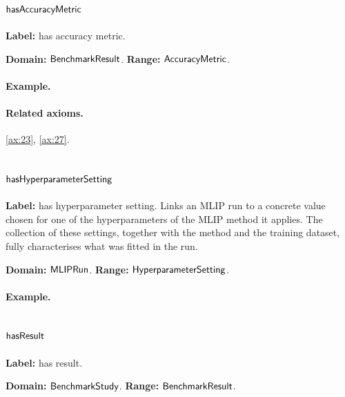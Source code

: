 \subsection{$\mathsf{hasAccuracyMetric}$}
\label{sec:term-hasAccuracyMetric}

\textbf{Label:} has accuracy metric.

\textbf{Domain:} $\mathsf{BenchmarkResult}$.
\textbf{Range:} $\mathsf{AccuracyMetric}$.

\paragraph{Example.}

\paragraph{Related axioms.} \eqref{ax:23}, \eqref{ax:27}.

\subsection{$\mathsf{hasHyperparameterSetting}$}
\label{sec:term-hasHyperparameterSetting}

\textbf{Label:} has hyperparameter setting.
Links an MLIP run to a concrete value chosen for one of the hyperparameters of the MLIP method it applies. The collection of these settings, together with the method and the training dataset, fully characterises what was fitted in the run.

\textbf{Domain:} $\mathsf{MLIPRun}$.
\textbf{Range:} $\mathsf{HyperparameterSetting}$.

\paragraph{Example.}

\subsection{$\mathsf{hasResult}$}
\label{sec:term-hasResult}

\textbf{Label:} has result.

\textbf{Domain:} $\mathsf{BenchmarkStudy}$.
\textbf{Range:} $\mathsf{BenchmarkResult}$.

